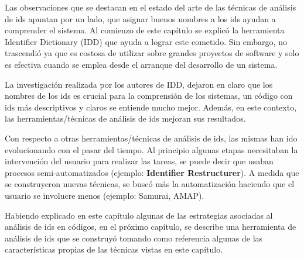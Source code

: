 Las observaciones que se destacan en el estado del arte de las técnicas de análisis de ids apuntan por un lado, que asignar buenos nombres a los ids ayudan a comprender el sistema. Al comienzo de este capítulo se explicó la herramienta Identifier Dictionary (IDD) que ayuda a lograr este cometido. Sin embargo, no trascendió ya que es costosa de utilizar sobre grandes proyectos de software y solo es efectiva cuando se emplea desde el arranque del desarrollo de un sistema.

La investigación realizada por los autores de IDD, dejaron en claro que los nombres de los ids es crucial para la comprensión de los sistemas, un código con ids más descriptivos y claros se entiende mucho mejor. Además, en este contexto, las herramientas/técnicas de análisis de ids mejoran sus resultados. 

Con respecto a otras herramientas/técnicas de análisis de ids, las mismas han ido evolucionando con el pasar del tiempo. Al principio algunas etapas necesitaban la intervención del usuario para realizar las tareas, se puede decir que usaban procesos semi-automatizados (ejemplo: \textbf{Identifier Restructurer}). A medida que se construyeron nuevas técnicas, se buscó más la automatización haciendo que el usuario se involucre menos (ejemplo: Samurai, AMAP). 

Habiendo explicado en este capítulo algunas de las estrategias asociadas al análisis de ids en códigos, en el próximo capítulo, se describe una herramienta de análisis de ids que se construyó tomando como referencia algunas de las características propias de las técnicas vistas en este capítulo.




